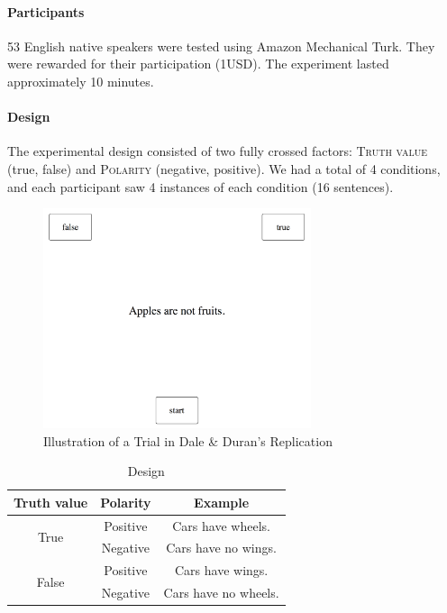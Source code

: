 \documentclass{article}
\begin{document}
\paragraph{Participants}
53 English native speakers were tested using Amazon Mechanical Turk. They were rewarded for their participation (1USD). The experiment lasted approximately 10 minutes. 

\paragraph{Design}
The experimental design consisted of two fully crossed factors: \textsc{Truth value} (true, false) and \textsc{Polarity} (negative, positive). We had a total of 4 conditions, and each participant saw 4 instances of each condition (16 sentences). 


\begin{figure}
\centering
\includegraphics[width=0.7\textwidth]{trial_example2.png}
\caption{Illustration of a Trial in Dale \& Duran's Replication}
\end{figure}



\begin{table}[h]
\centering
\begin{tabular}{ccc}
Truth value & Polarity & Example \\
\hline
\multirow{2}{*}{True} & Positive & Cars have wheels.\\ 
 & Negative & Cars have no wings.\\ 
\hline
\multirow{2}{*}{False} & Positive & Cars have wings.\\ 
 & Negative & Cars have no wheels.\\
\end{tabular}
\caption{Design} \label{table:exampleDD}
\end{table}
\end{document}
